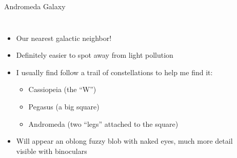 \documentclass[pdf, aspectratio=169]{beamer}
\begin{document}
\begin{frame}{Andromeda Galaxy}
	\begin{columns}
		\begin{itemize}
			\item Our nearest galactic neighbor!
			\item Definitely easier to spot away from light pollution
			\item I usually find follow a trail of constellations to help me find it:
				\begin{itemize}
					\item Cassiopeia (the ``W'')
					\item Pegasus (a big square)
					\item Andromeda (two ``legs'' attached to the square)
				\end{itemize}
			\item Will appear an oblong fuzzy blob with naked eyes, much more detail visible with binoculars
		\end{itemize}
		
		\begin{center}
			\vspace{-5mm}
\end{center}
\end{columns}
\end{frame}
\end{document}
